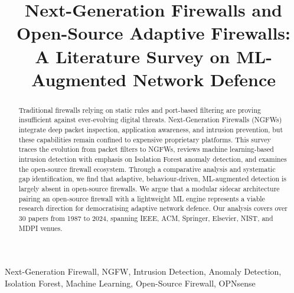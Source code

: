 \documentclass[conference]{IEEEtran}
\begin{document}
\title{Next-Generation Firewalls and Open-Source Adaptive Firewalls:\\A Literature Survey on ML-Augmented Network Defence}

\maketitle

\begin{abstract}
Traditional firewalls relying on static rules and port-based filtering are proving insufficient against ever-evolving digital threats. Next-Generation Firewalls (NGFWs) integrate deep packet inspection, application awareness, and intrusion prevention, but these capabilities remain confined to expensive proprietary platforms. This survey traces the evolution from packet filters to NGFWs, reviews machine learning-based intrusion detection with emphasis on Isolation Forest anomaly detection, and examines the open-source firewall ecosystem. Through a comparative analysis and systematic gap identification, we find that adaptive, behaviour-driven, ML-augmented detection is largely absent in open-source firewalls. We argue that a modular sidecar architecture pairing an open-source firewall with a lightweight ML engine represents a viable research direction for democratising adaptive network defence. Our analysis covers over 30 papers from 1987 to 2024, spanning IEEE, ACM, Springer, Elsevier, NIST, and MDPI venues.
\end{abstract}

\begin{IEEEkeywords}
Next-Generation Firewall, NGFW, Intrusion Detection, Anomaly Detection, Isolation Forest, Machine Learning, Open-Source Firewall, OPNsense
\end{IEEEkeywords}
\end{document}
